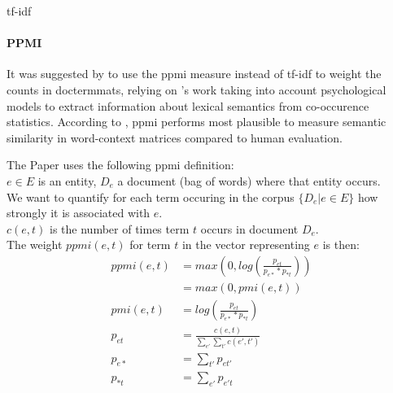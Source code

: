 \gls{tf-idf} 



\paragraph{PPMI}

It was suggested by \cite{Turney2010} to use the \gls{ppmi} measure instead of tf-idf to weight the counts in \glspl{doctermmat}, relying on \cite{Bullinaria2007}'s work taking into account psychological models to extract information about lexical semantics from co-occurence statistics. According to \cite{Turney2010,Bullinaria2007}, \gls{ppmi} performs most plausible to measure semantic similarity in word-context matrices compared to human evaluation. %



The Paper uses the following \gls{ppmi} definition:\\ 

\noindent $e \in E$ is an entity, $D_e$ a document (bag of words) where that entity occurs.\\
We want to quantify for each term occuring in the corpus $\{D_e | e \in E\}$ how strongly it is associated with $e$.\\
$c(e,t)$ is the number of times term $t$ occurs in document $D_e$. \\
The weight $ppmi(e,t)$ for term $t$ in the vector representing $e$ is then:
\begin{align*}
ppmi(e,t) &= max\left(0, log\left( \frac{p_{et}}{p_{e*}*p_{*t}} \right) \right) \\
          &= max\left(0, pmi(e,t) \right) \\
 pmi(e,t) &= log\left( \frac{p_{et}}{p_{e*}*p_{*t}} \right) \\          
   p_{et} &= \frac{c(e,t)}{\sum_{e'}\sum_{t'} c(e',t')} \\
   p_{e*} &= \sum_{t'}p_{et'} \\
   p_{*t} &= \sum_{e'}p_{e't} \\
\end{align*}

